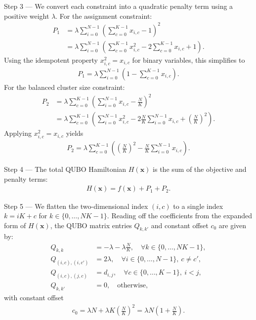 \documentclass[12pt]{article}
\begin{document}
Step 3 --- We convert each constraint into a quadratic penalty term using a positive weight $\lambda$. For the assignment constraint:
\begin{align}
  P_1 &= \lambda \sum_{i=0}^{N-1} \left( \sum_{c=0}^{K-1} x_{i,c} - 1 \right)^2 \\
      &= \lambda \sum_{i=0}^{N-1} \left( \sum_{c=0}^{K-1} x_{i,c}^2 - 2\sum_{c=0}^{K-1} x_{i,c} + 1 \right).
\end{align}
Using the idempotent property $x_{i,c}^2 = x_{i,c}$ for binary variables, this simplifies to
\begin{align}
  P_1 = \lambda \sum_{i=0}^{N-1} \left( 1 - \sum_{c=0}^{K-1} x_{i,c} \right).
\end{align}
For the balanced cluster size constraint:
\begin{align}
  P_2 &= \lambda \sum_{c=0}^{K-1} \left( \sum_{i=0}^{N-1} x_{i,c} - \frac{N}{K} \right)^2 \\
      &= \lambda \sum_{c=0}^{K-1} \left( \sum_{i=0}^{N-1} x_{i,c}^2 - 2\frac{N}{K}\sum_{i=0}^{N-1} x_{i,c} + \left(\frac{N}{K}\right)^2 \right).
\end{align}
Applying $x_{i,c}^2 = x_{i,c}$ yields
\begin{align}
  P_2 = \lambda \sum_{c=0}^{K-1} \left( \left(\frac{N}{K}\right)^2 - \frac{N}{K}\sum_{i=0}^{N-1} x_{i,c} \right).
\end{align}

Step 4 --- The total QUBO Hamiltonian $H(\mathbf{x})$ is the sum of the objective and penalty terms:
\begin{align}
  H(\mathbf{x}) = f(\mathbf{x}) + P_1 + P_2.
\end{align}

Step 5 --- We flatten the two-dimensional index $(i,c)$ to a single index $k = iK + c$ for $k \in \{0,\dots,NK-1\}$. Reading off the coefficients from the expanded form of $H(\mathbf{x})$, the QUBO matrix entries $Q_{k,k'}$ and constant offset $c_0$ are given by:
\begin{align}
  Q_{k,k} &= -\lambda - \lambda \frac{N}{K}, \quad \forall k \in \{0,\dots,NK-1\}, \\
  Q_{(i,c),(i,c')} &= 2\lambda, \quad \forall i \in \{0,\dots,N-1\}, \ c \neq c', \\
  Q_{(i,c),(j,c)} &= d_{i,j}, \quad \forall c \in \{0,\dots,K-1\}, \ i < j, \\
  Q_{k,k'} &= 0, \quad \text{otherwise},
\end{align}
with constant offset
\begin{align}
  c_0 = \lambda N + \lambda K \left(\frac{N}{K}\right)^2 = \lambda N \left(1 + \frac{N}{K}\right).
\end{align}
\end{document}
